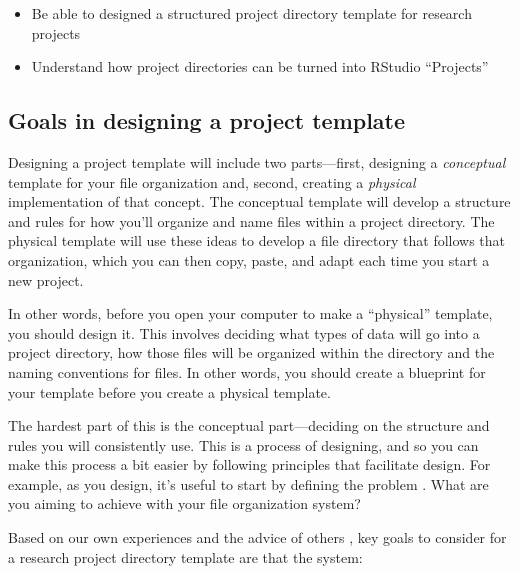 \documentclass[]{tufte-book}
\providecommand{\tightlist}{%
  \setlength{\itemsep}{0pt}\setlength{\parskip}{0pt}}
\begin{document}
\begin{itemize}
\tightlist
\item
  Be able to designed a structured project directory template for
  research projects
\item
  Understand how project directories can be turned into RStudio ``Projects''
\end{itemize}

\subsection{Goals in designing a project template}\label{goals-in-designing-a-project-template}

Designing a project template will include two parts---first, designing a
\emph{conceptual} template for your file organization and, second, creating a
\emph{physical} implementation of that concept. The conceptual template will
develop a structure and rules for how you'll organize and name files within a
project directory. The physical template will use these ideas to develop a file
directory that follows that organization, which you can then copy, paste, and
adapt each time you start a new project.

In other words, before you open your computer to make a ``physical'' template, you
should design it. This involves deciding what types of data will go into a
project directory, how those files will be organized within the directory and
the naming conventions for files. In other words, you should create a blueprint
for your template before you create a physical template.

The hardest part of this is the conceptual part---deciding on the structure and
rules you will consistently use. This is a process of designing, and so you can
make this process a bit easier by following principles that facilitate design.
For example, as you design, it's useful to start by defining the problem
\citep{osann2020design}. What are you aiming to achieve with your file organization
system?

Based on our own experiences and the advice of others \citep{marwick2018packaging, bertin2021creating}, key goals to consider for a research project
directory template are that the system:
\end{document}
